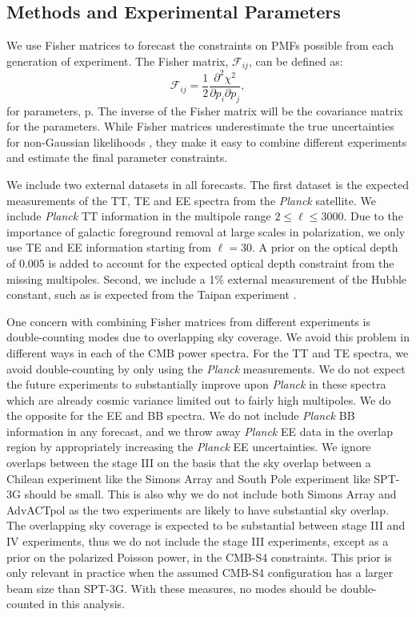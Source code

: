 \documentclass[apj]{emulateapj}
\newcommand{\be}{\begin{equation}}
\newcommand{\ee}{\end{equation}}
\newcommand{\planck}{{\sl Planck}}
\begin{document}
\subsection{Methods and Experimental Parameters}

We use Fisher matrices to forecast the constraints on PMFs possible from each generation of experiment. 
The Fisher matrix, $\mathcal{F}_{ij}$, can be defined as:
\be
\mathcal{F}_{ij} = \frac{1}{2} \frac{\partial^2 \chi^2}{\partial p_i \partial p_j},
\ee
for parameters, p. 
The inverse of the Fisher matrix will be the covariance matrix for the parameters. 
While Fisher matrices underestimate the true uncertainties for non-Gaussian likelihoods \citep[see e.g.,][]{wolz12}, they 
 make it easy to combine different experiments and estimate the final parameter constraints. 
 


We include two external datasets in all forecasts. 
The first dataset is the expected measurements of the  TT, TE and EE spectra from the \planck{} satellite. 
We include \planck{} TT information in the multipole range $2\le \ell \le 3000$. 
Due to the importance of galactic foreground removal at large scales in polarization, we only use TE and EE information starting from $\ell = 30$. 
A prior on the optical depth of 0.005 is added to account for the expected optical depth constraint from the missing multipoles. 
Second, we include a 1\% external measurement of the Hubble constant, such as is expected from the Taipan experiment \citep{kuehn14}. 

One concern with combining Fisher matrices from different experiments is double-counting modes due to overlapping sky coverage. 
We avoid this problem in different ways in each of the CMB power spectra. 
For the TT and TE spectra, we avoid double-counting by only using the \planck{} measurements. 
We do not expect the future experiments to substantially improve upon \planck{} in these spectra which are already cosmic variance limited out to fairly high multipoles. 
We do the opposite for the EE and BB spectra. 
We do not include \planck{} BB information in any forecast, and  we throw away \planck{} EE data in the overlap region by appropriately increasing the \planck{} EE uncertainties. 
We ignore overlaps between the stage III  on the basis that the sky overlap between a Chilean experiment like the Simons Array and South Pole experiment like SPT-3G should be small. 
This is also why we do not include both Simons Array and AdvACTpol as the two experiments are likely to have substantial sky overlap. 
The overlapping sky coverage is expected to be substantial between stage III and IV experiments, thus we do not include the stage III experiments, except as a prior on the polarized Poisson power, in the CMB-S4 constraints. 
This prior is only relevant in practice when the assumed CMB-S4 configuration has a larger beam size than SPT-3G. 
With these measures, no modes should be double-counted in this analysis. 
\end{document}
